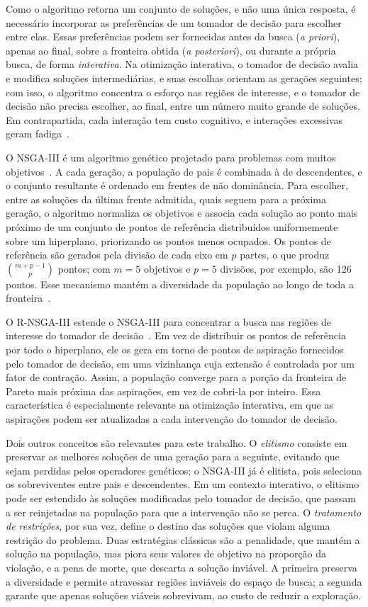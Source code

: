 \documentclass[conference]{IEEEtran}
\begin{document}
Como o algoritmo retorna um conjunto de soluções, e não uma única resposta, é necessário incorporar as preferências de um tomador de decisão para escolher entre elas. Essas preferências podem ser fornecidas antes da busca (\textit{a priori}), apenas ao final, sobre a fronteira obtida (\textit{a posteriori}), ou durante a própria busca, de forma \textit{interativa}. Na otimização interativa, o tomador de decisão avalia e modifica soluções intermediárias, e suas escolhas orientam as gerações seguintes; com isso, o algoritmo concentra o esforço nas regiões de interesse, e o tomador de decisão não precisa escolher, ao final, entre um número muito grande de soluções. Em contrapartida, cada interação tem custo cognitivo, e interações excessivas geram fadiga~\cite{castanho2026hitl}.

O NSGA-III é um algoritmo genético projetado para problemas com muitos objetivos~\cite{deb2014}. A cada geração, a população de pais é combinada à de descendentes, e o conjunto resultante é ordenado em frentes de não dominância. Para escolher, entre as soluções da última frente admitida, quais seguem para a próxima geração, o algoritmo normaliza os objetivos e associa cada solução ao ponto mais próximo de um conjunto de pontos de referência distribuídos uniformemente sobre um hiperplano, priorizando os pontos menos ocupados. Os pontos de referência são gerados pela divisão de cada eixo em $p$ partes, o que produz $\binom{m+p-1}{p}$ pontos; com $m=5$ objetivos e $p=5$ divisões, por exemplo, são 126 pontos. Esse mecanismo mantém a diversidade da população ao longo de toda a fronteira~\cite{deb2014}.

O R-NSGA-III estende o NSGA-III para concentrar a busca nas regiões de interesse do tomador de decisão~\cite{vesikar2018}. Em vez de distribuir os pontos de referência por todo o hiperplano, ele os gera em torno de pontos de aspiração fornecidos pelo tomador de decisão, em uma vizinhança cuja extensão é controlada por um fator de contração. Assim, a população converge para a porção da fronteira de Pareto mais próxima das aspirações, em vez de cobri-la por inteiro. Essa característica é especialmente relevante na otimização interativa, em que as aspirações podem ser atualizadas a cada intervenção do tomador de decisão.

Dois outros conceitos são relevantes para este trabalho. O \textit{elitismo} consiste em preservar as melhores soluções de uma geração para a seguinte, evitando que sejam perdidas pelos operadores genéticos; o NSGA-III já é elitista, pois seleciona os sobreviventes entre pais e descendentes. Em um contexto interativo, o elitismo pode ser estendido às soluções modificadas pelo tomador de decisão, que passam a ser reinjetadas na população para que a intervenção não se perca. O \textit{tratamento de restrições}, por sua vez, define o destino das soluções que violam alguma restrição do problema. Duas estratégias clássicas são a penalidade, que mantém a solução na população, mas piora seus valores de objetivo na proporção da violação, e a pena de morte, que descarta a solução inviável. A primeira preserva a diversidade e permite atravessar regiões inviáveis do espaço de busca; a segunda garante que apenas soluções viáveis sobrevivam, ao custo de reduzir a exploração.
\end{document}
